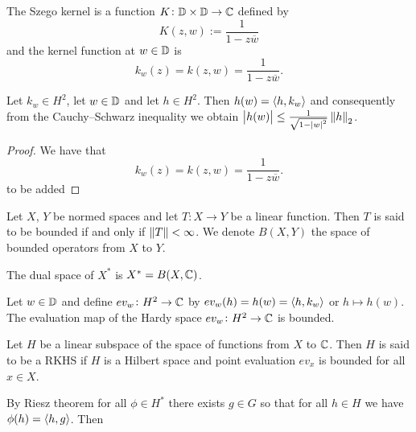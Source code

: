 \documentclass[11pt,a4paper]{article}
\begin{document}
\begin{definition}
  The Szego kernel is a function
  $K \colon \mathbb{D} \times \mathbb{D} \to \mathbb{C}$
  defined by
  \[
    K(z,w) := \frac{1}{1 - z \overline{w}}
  \]
  and the kernel function at $w \in \mathbb{D}$ is
  \[
    k_w(z) = k(z,w) = \frac{1}{1 - z \overline{w}}.
  \]
\end{definition}

\begin{proposition}
  Let $k_w \in H^2$,
  let $w \in \mathbb{D}$
  and let $h \in H^2$.
  Then $h(w) = \left\langle h, k_w \right\rangle$
  and consequently from the Cauchy--Schwarz inequality we obtain
  $\left\lvert h(w)\right\rvert \le \frac{1}{\sqrt{1 - \left\lvert w\right\rvert^2}} \left\lVert h\right\rVert_2$.
\end{proposition}
\begin{proof}
  We have that
  \[
    k_w(z) = k(z,w) = \frac{1}{1 - z \overline{w}}.
  \]
  to be added
\end{proof}

\begin{definition}
  Let $X$, $Y$ be normed spaces
  and let $T \colon X \to Y$ be a linear function.
  Then $T$ is said to be bounded if and only if $\left\lVert T\right\rVert < \infty$.
  We denote $B(X,Y)$ the space of bounded operators from $X$ to $Y$.
\end{definition}
\begin{remark}
  The dual space of $X^*$ is $X^* = B(X,\mathbb{C})$.
\end{remark}

\begin{remark}
  Let $w \in \mathbb{D}$ and define
  $ev_w \colon H^2 \to \mathbb{C}$ by
  $ev_w(h) = h(w) = \left\langle h, k_w \right\rangle$ or $h \mapsto h(w)$.
  The evaluation map of the Hardy space $ev_w \colon H^2 \to \mathbb{C}$ is bounded.
\end{remark}

\begin{definition}
  Let $H$ be a linear subspace of the space of functions from $X$ to $\mathbb{C}$.
  Then $H$ is said to be a RKHS if $H$ is a Hilbert space and
  point evaluation $ev_x$ is bounded for all $x \in X$.
\end{definition}

By Riesz theorem for all $\phi \in H^*$ there exists $g \in G$
so that for all $h \in H$ we have $\phi(h) = \left\langle h, g \right\rangle$.
Then %

\begin{definition}
  
\end{definition}
\end{document}
